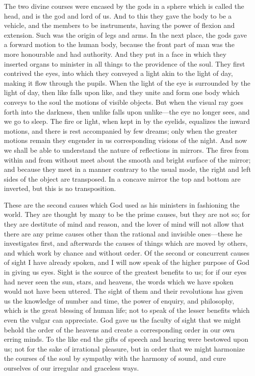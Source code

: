 \documentclass[11pt,letter]{article}
\begin{document}
\par  The two divine courses were encased by the gods in a sphere which is called the head, and is the god and lord of us. And to this they gave the body to be a vehicle, and the members to be instruments, having the power of flexion and extension. Such was the origin of legs and arms. In the next place, the gods gave a forward motion to the human body, because the front part of man was the more honourable and had authority. And they put in a face in which they inserted organs to minister in all things to the providence of the soul. They first contrived the eyes, into which they conveyed a light akin to the light of day, making it flow through the pupils. When the light of the eye is surrounded by the light of day, then like falls upon like, and they unite and form one body which conveys to the soul the motions of visible objects. But when the visual ray goes forth into the darkness, then unlike falls upon unlike—the eye no longer sees, and we go to sleep. The fire or light, when kept in by the eyelids, equalizes the inward motions, and there is rest accompanied by few dreams; only when the greater motions remain they engender in us corresponding visions of the night. And now we shall be able to understand the nature of reflections in mirrors. The fires from within and from without meet about the smooth and bright surface of the mirror; and because they meet in a manner contrary to the usual mode, the right and left sides of the object are transposed. In a concave mirror the top and bottom are inverted, but this is no transposition.

\par  These are the second causes which God used as his ministers in fashioning the world. They are thought by many to be the prime causes, but they are not so; for they are destitute of mind and reason, and the lover of mind will not allow that there are any prime causes other than the rational and invisible ones—these he investigates first, and afterwards the causes of things which are moved by others, and which work by chance and without order. Of the second or concurrent causes of sight I have already spoken, and I will now speak of the higher purpose of God in giving us eyes. Sight is the source of the greatest benefits to us; for if our eyes had never seen the sun, stars, and heavens, the words which we have spoken would not have been uttered. The sight of them and their revolutions has given us the knowledge of number and time, the power of enquiry, and philosophy, which is the great blessing of human life; not to speak of the lesser benefits which even the vulgar can appreciate. God gave us the faculty of sight that we might behold the order of the heavens and create a corresponding order in our own erring minds. To the like end the gifts of speech and hearing were bestowed upon us; not for the sake of irrational pleasure, but in order that we might harmonize the courses of the soul by sympathy with the harmony of sound, and cure ourselves of our irregular and graceless ways.
\end{document}
